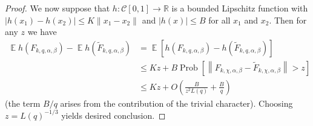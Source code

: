 \documentclass[12pt, a4paper]{amsart}
\theoremstyle{remark}
\newcommand{\R}{\ensuremath{\mathbb{R}}}
\DeclareMathOperator{\prob}{Prob}
\newcommand{\abs}[1]{\left|#1\right|}
\newcommand{\Cnorm}[1]{\left\|#1\right\|}
\DeclareMathOperator{\E}{\mathbb{E}}
\begin{document}
\begin{proof}
    We now suppose that $h:\mathscr C[0,1] \rightarrow \R$ is a bounded Lipschitz function with \linebreak
    $\abs{h(x_1) - h(x_2)} \le K\|x_1 - x_2\|$ and $|h(x)| \le B$ for all $x_1$ and
    $x_2$. Then for any $z$ we have
    \[
    \begin{split}
        \E h(F_{k,q,\alpha,\beta}) - \E h(\tilde F_{k,q,\alpha,\beta}) &= 
        \E \left[h(F_{k, q,\alpha,\beta}) - h(\tilde F_{k, q,\alpha,\beta})\right] \\
        &\le
        Kz + B\prob\left[\Cnorm{F_{k, \chi,\alpha,\beta} - \tilde F_{k, \chi,\alpha,\beta}} > z\right] \\
        &\le Kz + O\left(\frac{B}{z^2 L(q)} + \frac{B}{q}\right)
    \end{split}
    \]
    (the term $B/q$ arises from the contribution of the trivial character).
    Choosing $z = L(q)^{-1/3}$ yields desired conclusion.


\end{proof}
\end{document}
